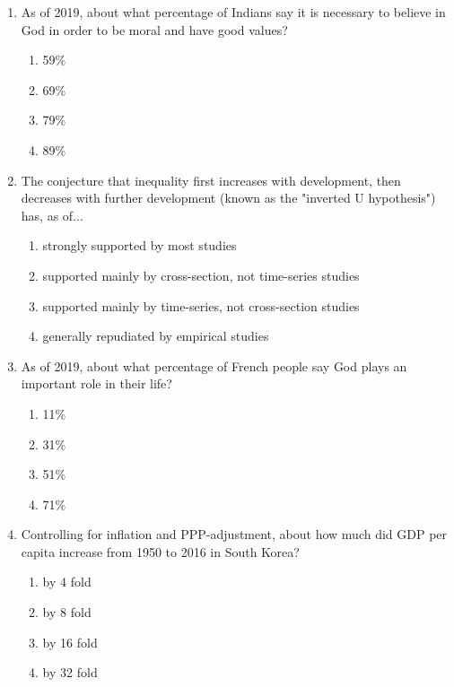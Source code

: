 \documentclass[12pt]{article}
\begin{document}
\begin{enumerate}[label=\arabic*.]
\begin{enumerate}[label=(\alph*)]
    \item 12 years
    \item 9 years
    \item 6 years
    \item 3 years
\end{enumerate}
\item As of 2019, about what percentage of Indians say it is necessary to believe in God in order to be moral and have good values?
\begin{enumerate}[label=(\alph*)]
    \item 59\%
    \item 69\%
    \item 79\%
    \item 89\%
\end{enumerate}
\item The conjecture that inequality first increases with development, then decreases with further development (known as the "inverted U hypothesis") has, as of...
\begin{enumerate}[label=(\alph*)]
    \item strongly supported by most studies
    \item supported mainly by cross-section, not time-series studies
    \item supported mainly by time-series, not cross-section studies
    \item generally repudiated by empirical studies
\end{enumerate}
\item As of 2019, about what percentage of French people say God plays an important role in their life?
\begin{enumerate}[label=(\alph*)]
    \item 11\%
    \item 31\%
    \item 51\%
    \item 71\%
\end{enumerate}
\item Controlling for inflation and PPP-adjustment, about how much did GDP per capita increase from 1950 to 2016 in South Korea?
\begin{enumerate}[label=(\alph*)]
    \item by 4 fold
    \item by 8 fold
    \item by 16 fold
    \item by 32 fold
\end{enumerate}

\end{enumerate}
\end{document}
